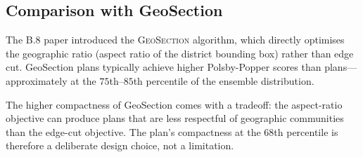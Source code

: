 \subsection{Comparison with GeoSection}

The B.8 paper \citep{dellaLibera2026b8} introduced the \textsc{GeoSection}
algorithm, which directly optimises the geographic ratio (aspect ratio of
the district bounding box) rather than edge cut.  GeoSection plans
typically achieve higher Polsby-Popper scores than \ar{} plans---approximately
at the $75$th--$85$th percentile of the ensemble distribution.

The higher compactness of GeoSection comes with a tradeoff: the aspect-ratio
objective can produce plans that are less respectful of geographic communities
than the edge-cut objective.  The \ar{} plan's compactness at the $68$th
percentile is therefore a deliberate design choice, not a limitation.
